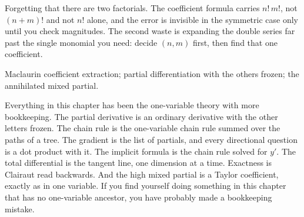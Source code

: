 \begin{trap}
Forgetting that there are two factorials. The coefficient formula carries $n!\,m!$, not $(n+m)!$ and not $n!$ alone, and the error is invisible in the symmetric case only until you check magnitudes. The second waste is expanding the double series far past the single monomial you need: decide $(n,m)$ first, then find that one coefficient.
\end{trap}

\begin{seealsob}Maclaurin coefficient extraction; partial differentiation with the others frozen; the annihilated mixed partial.\end{seealsob}

Everything in this chapter has been the one-variable theory with more bookkeeping. The partial derivative is an ordinary derivative with the other letters frozen. The chain rule is the one-variable chain rule summed over the paths of a tree. The gradient is the list of partials, and every directional question is a dot product with it. The implicit formula is the chain rule solved for $y'$. The total differential is the tangent line, one dimension at a time. Exactness is Clairaut read backwards. And the high mixed partial is a Taylor coefficient, exactly as in one variable. If you find yourself doing something in this chapter that has no one-variable ancestor, you have probably made a bookkeeping mistake.

